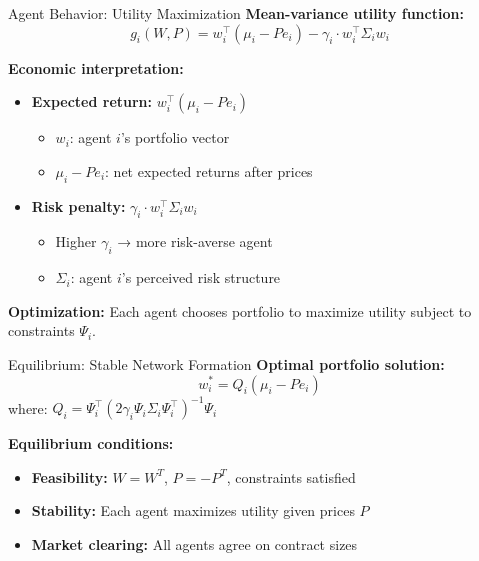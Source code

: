 \documentclass{beamer}
\begin{document}
\begin{frame}{Agent Behavior: Utility Maximization}
\textbf{Mean-variance utility function:}
\begin{equation}
g_i(W,P) = w_i^\top (\mu_i - P e_i) - \gamma_i \cdot w_i^\top \Sigma_i w_i
\end{equation}

\vspace{0.3cm}
\textbf{Economic interpretation:}
\begin{itemize}
    \item \textbf{Expected return:} $w_i^\top (\mu_i - P e_i)$
    \begin{itemize}
        \item $w_i$: agent $i$'s portfolio vector
        \item $\mu_i - P e_i$: net expected returns after prices
    \end{itemize}
    
    \item \textbf{Risk penalty:} $\gamma_i \cdot w_i^\top \Sigma_i w_i$
    \begin{itemize}
        \item Higher $\gamma_i$ → more risk-averse agent
        \item $\Sigma_i$: agent $i$'s perceived risk structure
    \end{itemize}
\end{itemize}

\vspace{0.3cm}
\textbf{Optimization:} Each agent chooses portfolio to maximize utility subject to constraints $\Psi_i$.
\end{frame}

\begin{frame}{Equilibrium: Stable Network Formation}
\textbf{Optimal portfolio solution:}
$$w_i^* = Q_i(\mu_i - Pe_i)$$
where: $Q_i = \Psi_i^\top(2\gamma_i\Psi_i\Sigma_i\Psi_i^\top)^{-1}\Psi_i$

\vspace{0.3cm}
\textbf{Equilibrium conditions:}
\begin{itemize}
    \item \textbf{Feasibility:} $W = W^T$, $P = -P^T$, constraints satisfied
    \item \textbf{Stability:} Each agent maximizes utility given prices $P$
    \item \textbf{Market clearing:} All agents agree on contract sizes
\end{itemize}

\end{frame}
\end{document}
